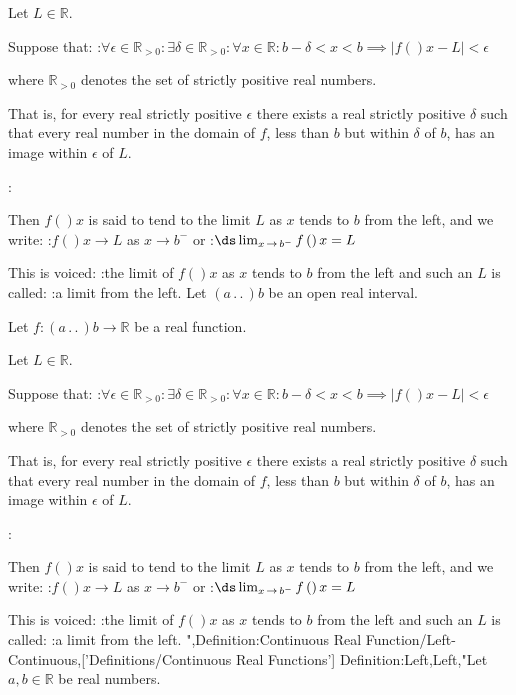 Let $L \in \mathbb R$.


Suppose that:
:$\forall \epsilon \in \mathbb R_{>0}: \exists \delta \in \mathbb R_{>0}: \forall x \in \mathbb R: b - \delta < x < b \implies \left\lvert f \left(   \right)x - L \right\rvert < \epsilon$

where $\mathbb R_{>0}$ denotes the set of strictly positive real numbers.

That is, for every real strictly positive $\epsilon$ there exists a real strictly positive $\delta$ such that every real number in the domain of $f$, less than $b$ but within $\delta$ of $b$, has an image within $\epsilon$ of $L$.


:

Then $f \left(   \right)x$ is said to tend to the limit $L$ as $x$ tends to $b$ from the left, and we write:
:$f \left(   \right)x \to L$ as $x \to b^-$
or
:$\ds \lim_{x \mathop \to b^-} f \left(   \right)x = L$


This is voiced:
:the limit of $f \left(   \right)x$ as $x$ tends to $b$ from the left
and such an $L$ is called:
:a limit from the left.
Let $\left( a \,.\,.\,   \right)b$ be an open real interval.

Let $f: \left( a \,.\,.\,   \right)b \to \mathbb R$ be a real function.

Let $L \in \mathbb R$.


Suppose that:
:$\forall \epsilon \in \mathbb R_{>0}: \exists \delta \in \mathbb R_{>0}: \forall x \in \mathbb R: b - \delta < x < b \implies \left\lvert f \left(   \right)x - L \right\rvert < \epsilon$

where $\mathbb R_{>0}$ denotes the set of strictly positive real numbers.

That is, for every real strictly positive $\epsilon$ there exists a real strictly positive $\delta$ such that every real number in the domain of $f$, less than $b$ but within $\delta$ of $b$, has an image within $\epsilon$ of $L$.


:

Then $f \left(   \right)x$ is said to tend to the limit $L$ as $x$ tends to $b$ from the left, and we write:
:$f \left(   \right)x \to L$ as $x \to b^-$
or
:$\ds \lim_{x \mathop \to b^-} f \left(   \right)x = L$


This is voiced:
:the limit of $f \left(   \right)x$ as $x$ tends to $b$ from the left
and such an $L$ is called:
:a limit from the left.
",Definition:Continuous Real Function/Left-Continuous,['Definitions/Continuous Real Functions']
Definition:Left,Left,"Let $a, b \in \mathbb R$ be real numbers.


